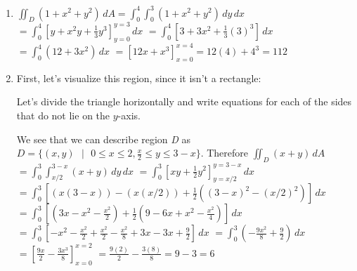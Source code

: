 \begin{Answer}[ref = total_mass]
\begin{enumerate}
    \item $\iint_{\textit{D}} \left(1 + x^2 + y^2 \right)\,dA = \int_0^4 
    \int_0^3 \left( 1  + x^2 + y^2 \right)\,dy\,dx$ $= \int_0^4 \left[y + x^2y 
    + \frac{1}{3}y^3 \right]_{y = 0}^{y = 3}\,dx$ $= \int_0^4 \left[ 3 + 3x^2 
    + \frac{1}{3}(3)^3 \right]\,dx$ $= \int_0^4 \left(12 + 3x^2 \right)\,dx$ 
    $= \left[ 12x + x^3 \right]_{x = 0}^{x = 4} = 12(4) + 4^3 = 112$
    \item First, let's visualize this region, since it isn't a rectangle:
    

    Let's divide the triangle horizontally and write equations for each of the 
    sides that do not lie on the $y$-axis.


    We see that we can describe region \textit{D} as $\textit{D} = \{ (x, y) 
    \text{ }|\text{ } 0 \leq x \leq 2, \frac{x}{2} \leq y \leq 3 - x\}$. 
    Therefore $\iint_{\textit{D}} \left( x + y \right) \,dA$ $= \int_0^3 \int_{
    x/2}^{3 - x} \left(x + y \right)\,dy\,dx$ $= \int_0^3 \left[xy + 
    \frac{1}{2} y^2 \right]_{y = x/2}^{y = 3 - x}\,dx$ $= \int_0^3 \left[ 
    \left(x(3 - x) \right) - \left(x (x/2) \right) + \frac{1}{2} \left( (3 - 
    x)^2 - (x/2)^2 \right) \right]\,dx$ $= \int_0^3 \left[ \left(3x - x^2 - 
    \frac{x^2}{2} \right) + \frac{1}{2} \left( 9 - 6x + x^2 - \frac{x^2}{4} 
    \right) \right]\,dx$ $= \int_0^3 \left[-x^2 - \frac{x^2}{2} + \frac{x^2}{2}
    - \frac{x^2}{8} + 3x - 3x + \frac{9}{2} \right]\,dx$ $= \int_0^3 \left( -
    \frac{9x^2}{8} + \frac{9}{2} \right)\,dx$ $= \left[ \frac{9x}{2} -\frac{
    3x^3}{8} \right]_{x = 0}^{x = 2}$ $= \frac{9(2)}{2} - \frac{3(8)}{8} = 9 - 
    3 = 6$
\end{enumerate}
\end{Answer}

